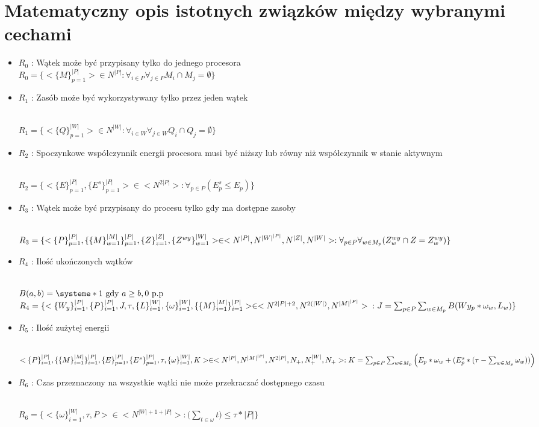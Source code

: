 \documentclass[a4paper,12pt]{extarticle}
\newcommand{\doubleLine}{
    \vspace*{20px} \\
}
\newcommand{\dolGora}[2]{
    _{#1}^{#2}
}
\newcommand{\klamry}[1]{
    \{#1\}
}
\newcommand{\iterate}[1]{
    \klamry{#1}\dolGora{i=1}{|#1|}
}
\newcommand{\iterateParam}[2]{
    \klamry{#1}\dolGora{i=1}{|#2|}
}
\begin{document}
\section{Matematyczny opis istotnych związków między wybranymi cechami}
    \begin{itemize}
        \item $R_0$ : Wątek może być przypisany tylko do jednego procesora  \doubleLine
            $R_0 = \{<\{M\}\dolGora{p=1}{|P|}> \in N^{|P|} : \forall_{i \in P} \forall_{j \in P} M_i \cap M_j = \emptyset \}$
        
        \item $R_1$ : Zasób może być wykorzystywany tylko przez jeden wątek
            \doubleLine
            $ R_1 = \klamry{ <\{Q\}\dolGora{p=1}{|W|}> \in N^{|W|} : \forall_{i \in W} \forall_{j \in W} Q_i \cap Q_j = \emptyset } $

        \item $R_2$ : Spoczynkowe współczynnik energii procesora musi być niższy lub równy niż współczynnik w stanie aktywnym
        \doubleLine
            $ R_2 = \{<\klamry{E}\dolGora{p=1}{|P|}, \klamry{E^s}\dolGora{p=1}{|P|}> \in <N^{2|P|}> : \forall_{p \in P}(E^s_p \leq E_p)  \}$
        
        \item $R_3$ : Wątek może być przypisany do procesu tylko gdy ma dostępne zasoby
        \doubleLine
            $R_3 = \{<\klamry{P}\dolGora{p=1}{|P|},\klamry{\klamry{M}\dolGora{w=1}{|M|}}\dolGora{p=1}{|P|},\klamry{Z}\dolGora{z=1}{|Z|}, \klamry{Z^{wy}}\dolGora{w=1}{|W|}> \in <N^{|P|},N^{|W|^{|P|}} ,N^{|Z|}, N^{|W|}> : \\
             \forall_{p \in P}
             \forall_{w \in M_p} (Z^{wy}_w \cap Z = Z^{wy}_w)  \} $
             
        \item $R_4$ : Ilość ukończonych wątków 
        \doubleLine
         $B(a,b)=\systeme*{1 \mbox{ gdy } a \geq b,0 \mbox{ p.p} }$ \\
            $R_4 = \{ <\iterateParam{W_y}{P},\iterate{P},J,\tau,\iterateParam{L}{W},\iterateParam{\omega}{W},\klamry{\iterateParam{M}{M}}\dolGora{i=1}{|P|}> \in <N^{2|P|+2},N^{2(|W|)}, N^{|M|^{|P|}} >\\
              :J=\sum_{p \in P}\sum_{w \in M_p} B(Wy_p  * \omega_w  , L_w) \}$

        \item $R_5$ : Ilość zużytej energii
        \doubleLine
            $<\iterate{P},\klamry{\iterateParam{M}{M}}\dolGora{i=1}{|P|},\klamry{E}\dolGora{p=1}{|P|}, \klamry{E^s}\dolGora{p=1}{|P|},\tau,\iterateParam{\omega}{W},K> \in <N^{|P|},N^{|M|^{|P|}},N^{2|P|},N_+,N_+^{|W|},N_+> :\\ 
            K = \sum_{p \in P} \sum_{w \in M_p} \Big(E_p * \omega_w + 
            (E^s_p * (\tau - \sum_{w \in M_p} \omega_w ))\Big)$
        
        \item $R_6$ : Czas przeznaczony na wszystkie wątki nie może przekraczać dostępnego czasu
        \doubleLine
            $R_6 =\{<\iterateParam{\omega}{W},\tau,P> \in <N^{|W| + 1 + |P|}> : \big(\sum_{t \in \omega}t\big) \leq \tau * |P|  \}$
    \end{itemize}
\end{document}
